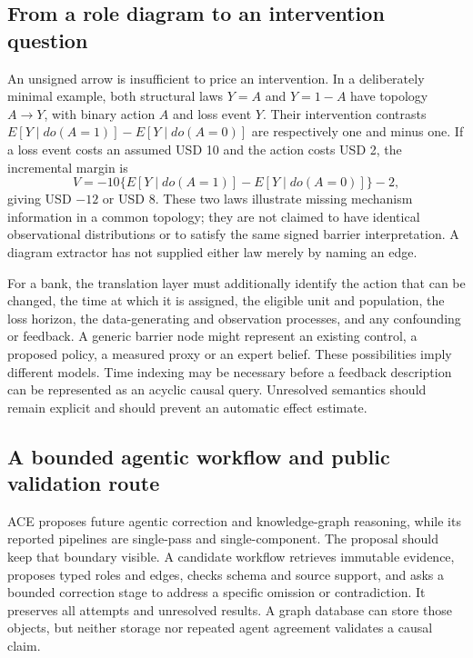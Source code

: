 \subsection{From a role diagram to an intervention question}
\label{exec21:ace-intervention}
An unsigned arrow is insufficient to price an intervention. In a deliberately minimal example, both structural laws $Y=A$ and $Y=1-A$ have topology $A\to Y$, with binary action $A$ and loss event $Y$. Their intervention contrasts $E[Y\mid do(A=1)]-E[Y\mid do(A=0)]$ are respectively one and minus one. If a loss event costs an assumed USD 10 and the action costs USD 2, the incremental margin is
\begin{equation}
 V=-10\{E[Y\mid do(A=1)]-E[Y\mid do(A=0)]\}-2,
 \label{exec21:ace-value}
\end{equation}
giving USD $-12$ or USD 8. These two laws illustrate missing mechanism information in a common topology; they are not claimed to have identical observational distributions or to satisfy the same signed barrier interpretation. A diagram extractor has not supplied either law merely by naming an edge.\citep{exec21_ace_reference}

For a bank, the translation layer must additionally identify the action that can be changed, the time at which it is assigned, the eligible unit and population, the loss horizon, the data-generating and observation processes, and any confounding or feedback. A generic barrier node might represent an existing control, a proposed policy, a measured proxy or an expert belief. These possibilities imply different models. Time indexing may be necessary before a feedback description can be represented as an acyclic causal query. Unresolved semantics should remain explicit and should prevent an automatic effect estimate.

\subsection{A bounded agentic workflow and public validation route}
\label{exec21:ace-integration}
ACE proposes future agentic correction and knowledge-graph reasoning, while its reported pipelines are single-pass and single-component. The proposal should keep that boundary visible. A candidate workflow retrieves immutable evidence, proposes typed roles and edges, checks schema and source support, and asks a bounded correction stage to address a specific omission or contradiction. It preserves all attempts and unresolved results. A graph database can store those objects, but neither storage nor repeated agent agreement validates a causal claim.\citep{exec21_ace}

